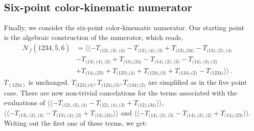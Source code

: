 \documentclass[a4paper,12pt]{article}
\def\sc#1{\overline{#1}}
\def\nn{\nonumber}
\newcommand{\npre}{\mathcal{N}}
\newcommand{\la}{\langle\!\langle}
\newcommand{\ra}{\rangle\!\rangle}
\begin{document}
\subsection{Six-point color-kinematic numerator}
Finally, we consider the six-point color-kinematic numerator. Our starting point is the algebraic construction of the numerator, which reads,
%
\begin{align}\label{N6}
    \npre_{\!f}(1234,\sc 5,\sc 6)&=\la 
    -T_{\text{(12)},\text{(3)},\text{(4)}}-T_{\text{(12)},\text{(4)},\text{(3)}}+T_{\text{(12)},\text{(34)}}
    -T_{\text{(13)},\text{(2)},\text{(4)}}\nn\\
    &
    -T_{\text{(13)},\text{(4)},\text{(2)}}+T_{\text{(13)},\text{(24)}}-T_{\text{(14)},\text{(2)},\text{(3)}}
    -T_{\text{(14)},\text{(3)},\text{(2)}}\nn\\
    &+T_{\text{(14)},\text{(23)}}
    +T_{\text{(123)},\text{(4)}}+T_{\text{(124)},\text{(3)}}
    +T_{\text{(134)},\text{(2)}}-T_{\text{(1234)}}\ra \, .
\end{align}
$T_{(1234)}$ is unchanged. $T_{\text{(123)},\text{(4)}},T_{\text{(124)},\text{(3)}},T_{\text{(134)},\text{(2)}}$ are simplified as in the five point case. There are new non-trivial cancelations for the terms associated with the evaluations of
$\la -T_{\text{(12)},\text{(3)},\text{(4)}}-T_{\text{(12)},\text{(4)},\text{(3)}}+T_{\text{(12)},\text{(34)}}\ra$, $\la -T_{\text{(13)},\text{(2)},\text{(4)}}-T_{\text{(13)},\text{(4)},\text{(2)}}+T_{\text{(13)},\text{(24)}}\ra$ and $\la -T_{\text{(14)},\text{(2)},\text{(3)}}-T_{\text{(14)},\text{(3)},\text{(2)}}+T_{\text{(14)},\text{(23)}}\ra$. 
%
Writing out the first one of these terms, we get:
%
\end{document}
